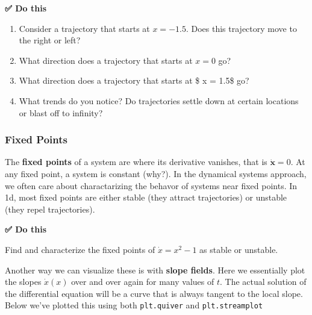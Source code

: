 \textbf{✅ Do this}

\begin{enumerate}
\def\labelenumi{\arabic{enumi}.}
\tightlist
\item
  Consider a trajectory that starts at \(x = -1.5\). Does this
  trajectory move to the right or left?
\item
  What direction does a trajectory that starts at \(x = 0\) go?
\item
  What direction does a trajectory that starts at \$ x = 1.5\$ go?
\item
  What trends do you notice? Do trajectories settle down at certain
  locations or blast off to infinity?
\end{enumerate}

\subsubsection{Fixed Points}\label{fixed-points}

The \textbf{fixed points} of a system are where its derivative vanishes,
that is \(\dot{\mathbf{x}} = 0\). At any fixed point, a system is
constant (why?). In the dynamical systems approach, we often care about
charactarizing the behavor of systems near fixed points. In 1d, most
fixed points are either stable (they attract trajectories) or unstable
(they repel trajectories).

\textbf{✅ Do this}

Find and characterize the fixed points of \(\dot{x} = x^2-1\) as stable
or unstable.

Another way we can visualize these is with \textbf{slope fields}. Here
we essentially plot the slopes \(\dot{x}(x)\) over and over again for
many values of \(t\). The actual solution of the differential equation
will be a curve that is always tangent to the local slope. Below we've
plotted this using both \texttt{plt.quiver} and \texttt{plt.streamplot}


